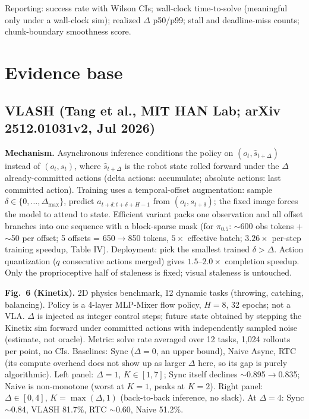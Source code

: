 \documentclass[10pt,letterpaper]{article}
\begin{document}
Reporting: success rate with Wilson CIs; wall-clock time-to-solve (meaningful only under a wall-clock sim); realized $\Delta$ p50/p99; stall and deadline-miss counts; chunk-boundary smoothness score.

\section{Evidence base}

\subsection{VLASH (Tang et al., MIT HAN Lab; arXiv 2512.01031v2, Jul 2026)}

\textbf{Mechanism.} Asynchronous inference conditions the policy on $(o_t, \hat s_{t+\Delta})$ instead of $(o_t, s_t)$, where $\hat s_{t+\Delta}$ is the robot state rolled forward under the $\Delta$ already-committed actions (delta actions: accumulate; absolute actions: last committed action). Training uses a temporal-offset augmentation: sample $\delta \in \{0,\dots,\Delta_{\max}\}$, predict $a_{t+\delta:t+\delta+H-1}$ from $(o_t, s_{t+\delta})$; the fixed image forces the model to attend to state. Efficient variant packs one observation and all offset branches into one sequence with a block-sparse mask (for $\pi_{0.5}$: $\sim$600 obs tokens + $\sim$50 per offset; 5 offsets = 650$\to$850 tokens, $5\times$ effective batch; $3.26\times$ per-step training speedup, Table IV). Deployment: pick the smallest trained $\delta > \Delta$. Action quantization ($q$ consecutive actions merged) gives $1.5$--$2.0\times$ completion speedup. Only the proprioceptive half of staleness is fixed; visual staleness is untouched.

\textbf{Fig.\ 6 (Kinetix).} 2D physics benchmark, 12 dynamic tasks (throwing, catching, balancing). Policy is a 4-layer MLP-Mixer flow policy, $H=8$, 32 epochs; not a VLA. $\Delta$ is injected as integer control steps; future state obtained by stepping the Kinetix sim forward under committed actions with independently sampled noise (estimate, not oracle). Metric: solve rate averaged over 12 tasks, 1,024 rollouts per point, no CIs. Baselines: Sync ($\Delta=0$, an upper bound), Naive Async, RTC (its compute overhead does not show up as larger $\Delta$ here, so its gap is purely algorithmic). Left panel: $\Delta=1$, $K\in[1,7]$; Sync itself declines $\sim$0.895$\to$0.835; Naive is non-monotone (worst at $K=1$, peaks at $K=2$). Right panel: $\Delta\in[0,4]$, $K=\max(\Delta,1)$ (back-to-back inference, no slack). At $\Delta=4$: Sync $\sim$0.84, VLASH 81.7\%, RTC $\sim$0.60, Naive 51.2\%.
\end{document}
